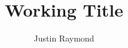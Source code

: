 \documentclass[11pt]{westhesis}
\title{Working Title}
\author{Justin Raymond}
\begin{document}
\frontmatter
\maketitle
\makededication
\makeack
\makeabstract        %
\tableofcontents

\mainmatter











\end{document}

